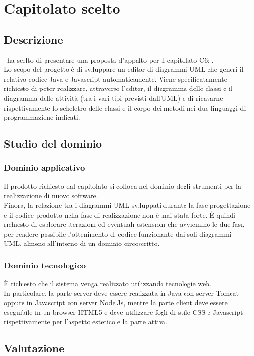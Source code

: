 \documentclass[../StudioDiFattibilita.tex]{subfiles}
\begin{document}
	\section{Capitolato scelto}
		\subsection{Descrizione}
			\kaleidoscode\ ha scelto di presentare una proposta d'appalto per il capitolato C6: \progetto.\\
			Lo scopo del progetto è di sviluppare un editor di diagrammi UML che generi il relativo codice Java e
			Javascript automaticamente.
			Viene specificatamente richiesto di poter realizzare, attraverso l'editor, il diagramma delle classi
			e il diagramma delle attività (tra i vari tipi previsti dall'UML) e di ricavarne rispettivamente lo
			scheletro delle classi e il corpo dei metodi nei due linguaggi di programmazione indicati.
		\subsection{Studio del dominio}
			\subsubsection{Dominio applicativo}
				Il prodotto richiesto dal capitolato si colloca nel dominio degli strumenti per la realizzazione
				di nuovo software.\\
				Finora, la relazione tra i diagrammi UML sviluppati durante la fase progettazione e il codice
				prodotto nella fase di realizzazione non è mai stata forte.
				È quindi richiesto di esplorare iterazioni ed eventuali estensioni che avvicinino le due fasi,
				per rendere possibile l'ottenimento di codice funzionante dai soli diagrammi UML, almeno
				all'interno di un dominio circoscritto.
			\subsubsection{Dominio tecnologico}
				È richiesto che il sistema venga realizzato utilizzando tecnologie web.\\
				In particolare, la parte server deve essere realizzata in Java con server Tomcat oppure in
				Javascript con server Node.Js, mentre la parte client deve essere eseguibile in un browser
				HTML5 e deve utilizzare fogli di stile CSS e Javascript rispettivamente per l'aspetto estetico e
				la parte attiva.
		\subsection{Valutazione}
\end{document}
